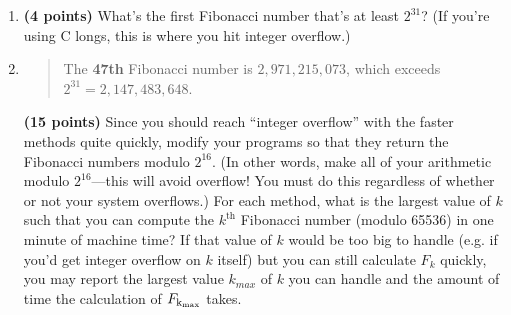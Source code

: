 \documentclass[11pt]{article}
\begin{document}
\begin{enumerate}[leftmargin=*]
\begin{enumerate}
\begin{quote}
  Edit: After seeing part $c$, I realize my test might not look very creative. If you'd like actual times, computing the $32$nd Fibonacci number takes the following times:
  \begin{itemize}
    \item Recursive: 15.812041ms
    \item Iterative: 167ns
    \item Matrix: 83ns
  \end{itemize}
\end{quote}
\item
{\bf (4 points)}
What's the first Fibonacci number that's at least $2^{31}$? (If you're using C longs, this is where you hit
integer overflow.)
\item
  \begin{quote}
    \color{purple}
  The \textbf{47th} Fibonacci number is $2,971,215,073$, which exceeds $2^{31} = 2,147,483,648$. 
  \end{quote}
{\bf (15 points)}
Since you should reach ``integer overflow'' with the faster methods quite quickly, modify your programs
so that they return the Fibonacci numbers modulo $2^{16}$. (In other words, make all of your
arithmetic modulo $2^{16}$---this will avoid overflow! You must do this regardless of whether or not your
system overflows.) For each method, what is the largest value of $k$ such that you can compute the
$k^\text{th}$ Fibonacci number (modulo 65536) in one minute of machine time? If that value of $k$ would be too big to handle (e.g. if you'd get integer overflow on $k$ itself) but you can still calculate $F_{k}$ quickly, you may report the largest value $k_{max}$ of $k$ you can handle and the amount of time the calculation of $F_{\rm k_{max}}$ takes. 
\begin{quote}
  \color{purple}

\end{quote}
\end{enumerate}



\end{enumerate}
\end{document}
